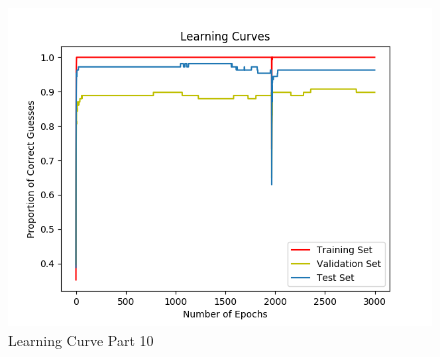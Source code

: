 \documentclass[10pt,letterpaper]{article}
\begin{document}
	\begin{figure}[H]
		\centering
		\includegraphics[width=\linewidth]{Part10LearningCurve.png}
		\caption{Learning Curve Part 10}
		\label{fig:part9}
	\end{figure}
\end{document}
